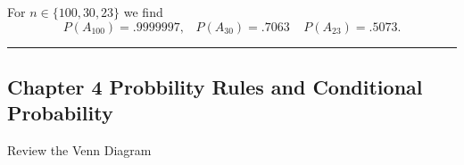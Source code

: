 \documentclass[
]{book}
\theoremstyle{definition}
\theoremstyle{definition}
\theoremstyle{definition}
\theoremstyle{definition}
\theoremstyle{remark}
\begin{document}
For \(n\in\{100, 30, 23\}\) we find
\[P(A_{100})= .9999997,\;\;\; P(A_{30})=.7063 \;\;\;\; P(A_{23})=.5073.\]

\begin{center}\rule{0.5\linewidth}{0.5pt}\end{center}

\hypertarget{chapter-4-probbility-rules-and-conditional-probability}{%
\subsection{Chapter 4 Probbility Rules and Conditional Probability}\label{chapter-4-probbility-rules-and-conditional-probability}}

Review the Venn Diagram

  
\end{document}
